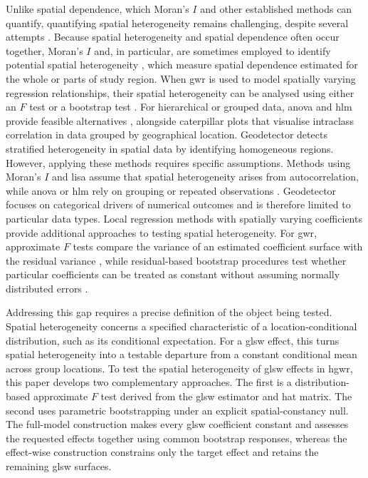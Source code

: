 \documentclass[times]{interact}
\theoremstyle{plain}%
\theoremstyle{definition}
\theoremstyle{remark}
\newcommand{\acrcite}[1]{\glsentrylong{#1} \ifglshasfield{useri}{#1}{\citep[\glsentryshort{#1};][]{\glscurrentfieldvalue}}{}\glsunset{#1}}
\newcommand{\morani}{Moran's $I$\xspace}
\begin{document}
Unlike spatial dependence, which \morani \citep{Moran-1950,LiCalder-2007} and other established methods can quantify, quantifying spatial heterogeneity remains challenging, despite several attempts \citep{TranPearson-2022}.
Because spatial heterogeneity and spatial dependence often occur together, \morani and, in particular, \acrcite{lisa}
are sometimes employed to identify potential spatial heterogeneity \citep{JacksonHuang-2009,ZhangLin-2016}, which measure spatial dependence estimated for the whole or parts of study region.
When \gls{gwr} is used to model spatially varying regression relationships, their spatial heterogeneity can be analysed using either an $F$ test \citep{LeungMei-2000} or a bootstrap test \citep{HarrisBrunsdon-2017}.
For hierarchical or grouped data, \gls{anova} and \gls{hlm} provide feasible alternatives \citep{DutilleulLegendre-1993,FotheringhamBrunsdon-2010,LignierJarvis-2024,KirkbrideStochl-2015}, alongside caterpillar plots that visualise intraclass correlation in data grouped by geographical location.
Geodetector \citep{WangZhang-2016,ZhaoLiu-2021,HuoSun-2021} detects stratified heterogeneity in spatial data by identifying homogeneous regions.
However, applying these methods requires specific assumptions.
Methods using \morani and \gls{lisa} assume that spatial heterogeneity arises from autocorrelation, while \gls{anova} or \gls{hlm} rely on grouping or repeated observations \citep{HuLu-2022,HuHarris-2024}.
Geodetector focuses on categorical drivers of numerical outcomes and is therefore limited to particular data types.
Local regression methods with spatially varying coefficients provide additional approaches to testing spatial heterogeneity.
For \gls{gwr}, approximate $F$ tests compare the variance of an estimated coefficient surface with the residual variance \citep{LeungMei-2000}, while residual-based bootstrap procedures test whether particular coefficients can be treated as constant without assuming normally distributed errors \citep{MeiXu-2016,HarrisBrunsdon-2017}.

Addressing this gap requires a precise definition of the object being tested.
Spatial heterogeneity concerns a specified characteristic of a location-conditional distribution, such as its conditional expectation.
For a \gls{glsw} effect, this turns spatial heterogeneity into a testable departure from a constant conditional mean across group locations.
To test the spatial heterogeneity of \gls{glsw} effects in \gls{hgwr}, this paper develops two complementary approaches.
The first is a distribution-based approximate $F$ test derived from the \gls{glsw} estimator and hat matrix.
The second uses parametric bootstrapping under an explicit spatial-constancy null.
The full-model construction makes every \gls{glsw} coefficient constant and assesses the requested effects together using common bootstrap responses, whereas the effect-wise construction constrains only the target effect and retains the remaining \gls{glsw} surfaces.
\end{document}
